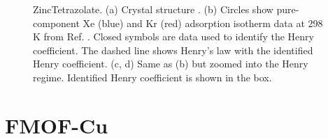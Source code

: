     \begin{figure}[h!]
       \centering
  
       
       \caption{ZincTetrazolate. (a) Crystal structure \cite{ZincTetrazolate_structure}.
       (b) Circles show pure-component Xe (blue) and Kr (red) adsorption isotherm data at 298 K from Ref. \cite{ZincTetrazolate_XeKr}. 
       Closed symbols are data used to identify the Henry coefficient. The dashed line shows Henry's law with the identified Henry coefficient.
       (c, d) Same as (b) but zoomed into the Henry regime. Identified Henry coefficient is shown in the box.}
    \end{figure}
    
    \clearpage
    
    
    \section{FMOF-Cu}
    
